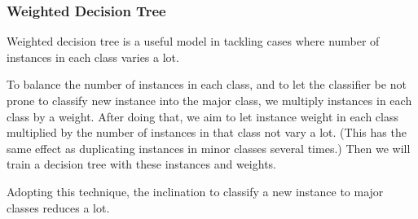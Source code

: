 \documentclass[english]{article}
\begin{document}
\subsubsection{Weighted Decision Tree}
\label{weightdtc}
\par Weighted decision tree is a useful model in tackling cases where number of instances in each class varies a lot.
\par To balance the number of instances in each class, and to let the classifier be not prone to classify new instance into the major class, we multiply instances in each class by a weight. After doing that, we aim to let instance weight in each class multiplied by the number of instances in that class not vary a lot. (This has the same effect as duplicating instances in minor classes several times.) Then we will train a decision tree with these instances and weights.
\par Adopting this technique, the inclination to classify a new instance to major classes reduces a lot.
\end{document}
